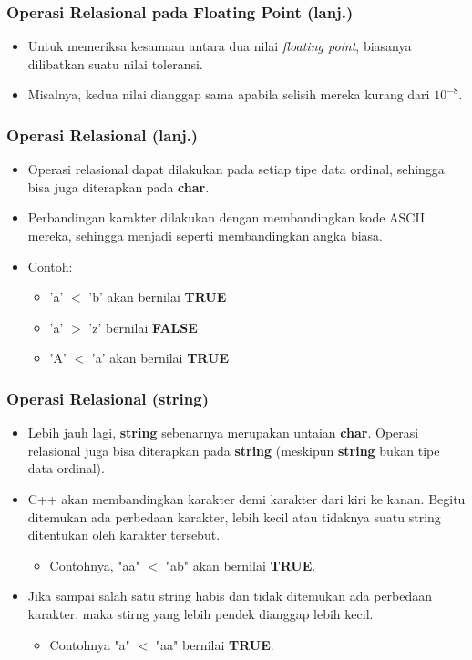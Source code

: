 \begin{frame}
\frametitle{Operasi Relasional pada Floating Point (lanj.)}
\begin{itemize}
  \item Untuk memeriksa kesamaan antara dua nilai \textit{floating point}, biasanya dilibatkan suatu nilai toleransi.
  \item Misalnya, kedua nilai dianggap sama apabila selisih mereka kurang dari $10^{-8}$.
\end{itemize}
\end{frame}

\begin{frame}
\frametitle{Operasi Relasional (lanj.)}
\begin{itemize}
  \item Operasi relasional dapat dilakukan pada setiap tipe data ordinal, sehingga bisa juga diterapkan pada \textbf{char}.
  \item Perbandingan karakter dilakukan dengan membandingkan kode ASCII mereka, sehingga menjadi seperti membandingkan angka biasa.
  \item Contoh:
  \begin{itemize}
    \item 'a' $<$ 'b' akan bernilai \textbf{TRUE}
    \item 'a' $>$ 'z' bernilai \textbf{FALSE}
    \item 'A' $<$ 'a' akan bernilai \textbf{TRUE}
  \end{itemize}
\end{itemize}
\end{frame}

\begin{frame}
\frametitle{Operasi Relasional (string)}
\begin{itemize}
  \item Lebih jauh lagi, \textbf{string} sebenarnya merupakan untaian \textbf{char}. Operasi relasional juga bisa diterapkan pada \textbf{string} (meskipun \textbf{string} bukan tipe data ordinal).
  \item C++ akan membandingkan karakter demi karakter dari kiri ke kanan. Begitu ditemukan ada perbedaan karakter, lebih kecil atau tidaknya suatu string ditentukan oleh karakter tersebut.
  \begin{itemize}
    \item Contohnya, "aa" $<$ "ab" akan bernilai \textbf{TRUE}.
  \end{itemize}
  \item Jika sampai salah satu string habis dan tidak ditemukan ada perbedaan karakter, maka stirng yang lebih pendek dianggap lebih kecil.
  \begin{itemize}
    \item Contohnya "a" $<$ "aa" bernilai \textbf{TRUE}.
  \end{itemize}
\end{itemize}
\end{frame}

